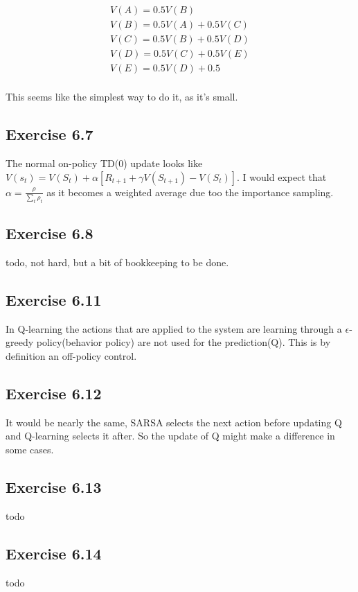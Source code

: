 \begin{equation}
\begin{split}
V(A) = 0.5 V(B)\\
V(B) = 0.5 V(A) + 0.5 V(C)\\
V(C) = 0.5 V(B) + 0.5 V(D)\\
V(D) = 0.5 V(C) + 0.5 V(E)\\
V(E) = 0.5 V(D) + 0.5\\
\end{split}
\end{equation}

This seems like the simplest way to do it, as it's small.

\subsection{Exercise 6.7}
The normal on-policy TD(0) update looks like $V(s_t) = V(S_t) + \alpha[R_{t+1}+\gamma V(S_{t+1}) - V(S_t)]$. I would expect that $\alpha=\frac{\rho}{\sum_t \rho_t }$ as it becomes a weighted average due too the importance sampling.

\subsection{Exercise 6.8}
todo, not hard, but a bit of bookkeeping to be done.

\subsection{Exercise 6.11}
In Q-learning the actions that are applied to the system are learning through a $\epsilon$-greedy policy(behavior policy) are not used for the prediction(Q). This is by definition an off-policy control.

\subsection{Exercise 6.12}
It would be nearly the same, SARSA selects the next action before updating Q and Q-learning selects it after. So the update of Q might make a difference in some cases.

\subsection{Exercise 6.13}
todo

\subsection{Exercise 6.14}
todo